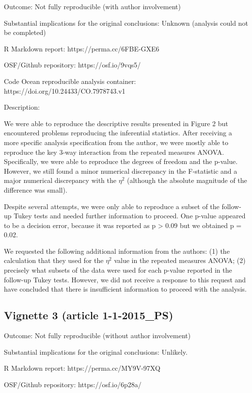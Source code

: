 \documentclass[english,,man,floatsintext]{apa6}
\begin{document}
\begin{appendix}
Outcome: Not fully reproducible (with author involvement)

Substantial implications for the original conclusions: Unknown (analysis
could not be completed)

R Markdown report: https://perma.cc/6FBE-GXE6

OSF/Github repository: https://osf.io/9vqs5/

Code Ocean reproducible analysis container:
https://doi.org/10.24433/CO.7978743.v1

Description:

We were able to reproduce the descriptive results presented in Figure 2
but encountered problems reproducing the inferential statistics. After
receiving a more specific analysis specification from the author, we
were mostly able to reproduce the key 3-way interaction from the
repeated measures ANOVA. Specifically, we were able to reproduce the
degrees of freedom and the p-value. However, we still found a minor
numerical discrepancy in the F-statistic and a major numerical
discrepancy with the \(\eta^2\) (although the absolute magnitude of the
difference was small).

Despite several attempts, we were only able to reproduce a subset of the
follow-up Tukey tests and needed further information to proceed. One
p-value appeared to be a decision error, because it was reported as p
\textgreater{} 0.09 but we obtained p = 0.02.

We requested the following additional information from the authors: (1)
the calculation that they used for the \(\eta^2\) value in the repeated
measures ANOVA; (2) precisely what subsets of the data were used for
each p-value reported in the follow-up Tukey tests. However, we did not
receive a response to this request and have concluded that there is
insufficient information to proceed with the analysis.

\hypertarget{vignette-3-article-1-1-2015_ps}{%
\subsection{Vignette 3 (article
1-1-2015\_PS)}\label{vignette-3-article-1-1-2015_ps}}

Outcome: Not fully reproducible (without author involvement)

Substantial implications for the original conclusions: Unlikely.

R Markdown report: https://perma.cc/MY9V-97XQ

OSF/Github repository: https://osf.io/6p28a/


\end{appendix}
\end{document}
